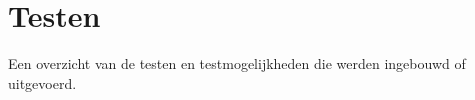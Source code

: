 
\chapter{Testen}

Een overzicht van de testen en testmogelijkheden die werden ingebouwd of
uitgevoerd.

